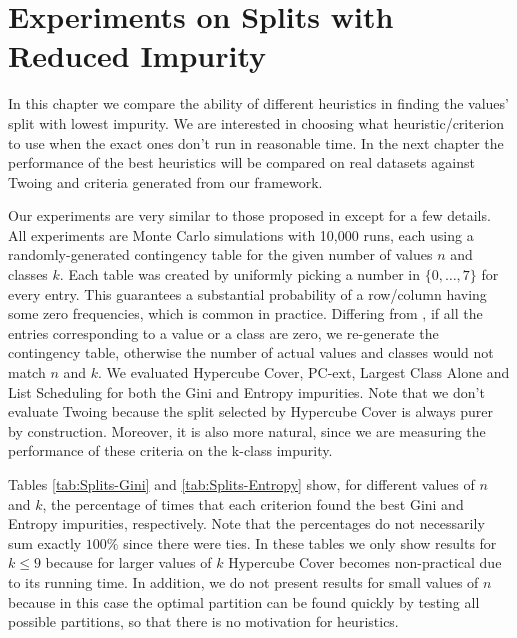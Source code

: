 \newpage

\chapter{Experiments on Splits with Reduced Impurity}
\label{chap:experiments-splits}

In this chapter we compare the ability of different heuristics in finding the values' split with lowest impurity. We are interested in choosing what heuristic/criterion to use when the exact ones don't run in reasonable time. In the next chapter the performance of the best heuristics will be compared on real datasets against Twoing and criteria generated from our framework.

Our experiments are very similar to those proposed in \cite{journals/datamine/CoppersmithHH99} except for a few details. All experiments are Monte Carlo simulations with 10,000 runs, each using a randomly-generated contingency table for the given number of values $n$ and classes $k$. Each table  was created by uniformly picking a number in $\{0, \ldots, 7\}$ for every entry. This guarantees a substantial probability of a row/column having some zero frequencies, which is common in practice. Differing from  \cite{journals/datamine/CoppersmithHH99}, if all the entries corresponding to a value or a class are zero, we re-generate the contingency table, otherwise the number of actual values and classes would not match $n$ and $k$. We evaluated Hypercube Cover, PC-ext,
Largest Class Alone and List Scheduling for both the Gini and Entropy impurities. Note that we don't evaluate Twoing because the split selected by Hypercube Cover is always purer by construction. Moreover, it is also more natural, since we are measuring the performance of these criteria on the k-class impurity.

Tables \ref{tab:Splits-Gini} and \ref{tab:Splits-Entropy} show, for different values of $n$ and $k$, the percentage of times that
each criterion found the best Gini and Entropy impurities, respectively. Note that the percentages do not necessarily sum exactly $100\%$ since
there were ties. In these tables we only show results for $k \leq 9$ because for larger values
of $k$ Hypercube Cover becomes non-practical due to its running time. In addition, we do not present results for small values of $n$ because in this
case the optimal  partition can be found quickly by testing all possible partitions, so that there is no motivation for heuristics.

